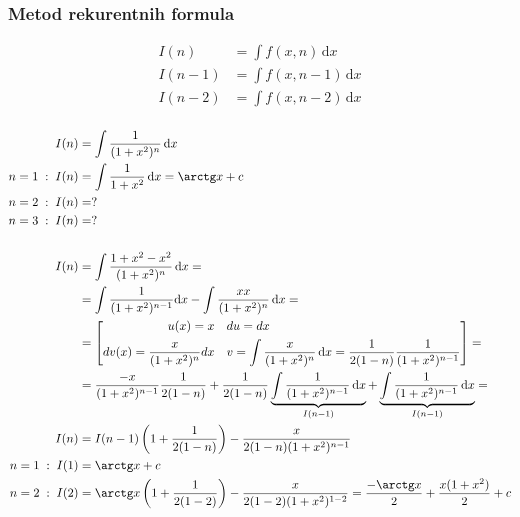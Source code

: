 \subsubsection{Metod rekurentnih formula}
	\begin{align*}
		I(n) &= \int f(x, n)\, \mathrm{d}x\\
		I(n-1) &= \int f(x, n-1)\, \mathrm{d}x\\
		I(n-2) &= \int f(x, n-2)\, \mathrm{d}x\\
	\end{align*}
	\begin{example}
		\begin{align*}
			I(n) &= \int \frac{1}{(1+x^2)^n}\, \mathrm{d}x\\
			n=1\; : \; I(n) &= \int \frac{1}{1+x^2}\, \mathrm{d}x = \arctg x + c\\
			n=2\; : \; I(n) &= ?\\
			n=3\; : \; I(n) &= ?\\
			\\
			I(n) &= \int \frac{1+x^2-x^2}{(1+x^2)^n}\, \mathrm{d}x =\\
			&=\int \frac{1}{(1+x^2)^{n-1}}\mathrm{d}x-\int \frac{xx}{(1+x^2)^n}\, \mathrm{d}x =\\
			&= \left[
			\begin{aligned}
				u(x) = x &\quad du = dx\\
				dv(x) = \frac{x}{(1+x^2)^n}dx &\quad v = \int \frac{x}{(1+x^2)^n}\, \mathrm{d}x = \frac{1}{2(1-n)}\frac{1}{(1+x^2)^{n-1}}			
			\end{aligned}
			\right]=\\
			&= \frac{-x}{(1+x^2)^{n-1}}\frac{1}{2(1-n)}+\frac{1}{2(1-n)}\underbrace{\int \frac{1}{(1+x^2)^{n-1}}\, \mathrm{d}x}_{I(n-1)} + \underbrace{\int \frac{1}{(1+x^2)^{n-1}}\, \mathrm{d}x}_{I(n-1)} =\\
			I(n) &= I(n-1)\left( 1+\frac{1}{2(1-n)}\right) - \frac{x}{2(1-n)(1+x^2)^{n-1}}\\
			n=1\; : \; I(1) &= \arctg x +c\\
			n=2\; : \; I(2) &= \arctg x\left(1+\frac{1}{2(1-2)}\right)-\frac{x}{2(1-2)(1+x^2)^{1-2}} = \frac{-\arctg x}{2} + \frac{x(1+x^2)}{2} +c
		\end{align*}
	\end{example}


